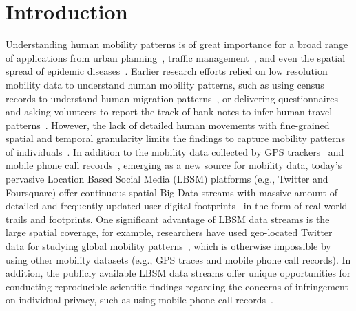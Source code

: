 \documentclass[a4paper, 11pt]{article}
\begin{document}
\section{Introduction}
Understanding human mobility patterns is of great importance for a broad range of applications from urban planning~\citep{zheng2008understanding}, traffic management~\citep{jiang2009characterizing}, and even the spatial spread of epidemic diseases~\citep{belik2011natural}.
Earlier research efforts relied on low resolution mobility data to understand human mobility patterns, such as using census records to understand human migration patterns~\citep{greenwood1985human}, or delivering questionnaires and asking volunteers to report the track of bank notes to infer human travel patterns~\citep{brockmann2006scaling}.
However, the lack of detailed human movements with fine-grained spatial and temporal granularity limits the findings to capture mobility patterns of individuals~\citep{gonzalez2008understanding,Jurdak2015}.
In addition to the mobility data collected by GPS trackers~\citep{zheng2008understanding, rhee2011levy} and mobile phone call records~\citep{gonzalez2008understanding,sevtsuk2010does,kung2014exploring}, 
emerging as a new source for mobility data, today's pervasive Location Based Social Media (LBSM) platforms (e.g., Twitter and Foursquare) offer continuous spatial Big Data streams with massive amount of detailed and frequently updated user digital footprints~\citep{thatcher2014living} in the form of real-world trails and footprints.
One significant advantage of LBSM data streams is the large spatial coverage, for example, researchers have used geo-located Twitter data for studying global mobility patterns~\citep{hawelka2014geo}, which is otherwise impossible by using other mobility datasets (e.g., GPS traces and mobile phone call records). 
In addition, the publicly available LBSM data streams offer unique opportunities for conducting reproducible scientific findings regarding the concerns of infringement on individual privacy, such as using mobile phone call records~\citep{giannotti2008mobility,crampton2014collect,Jurdak2015}.
\end{document}
